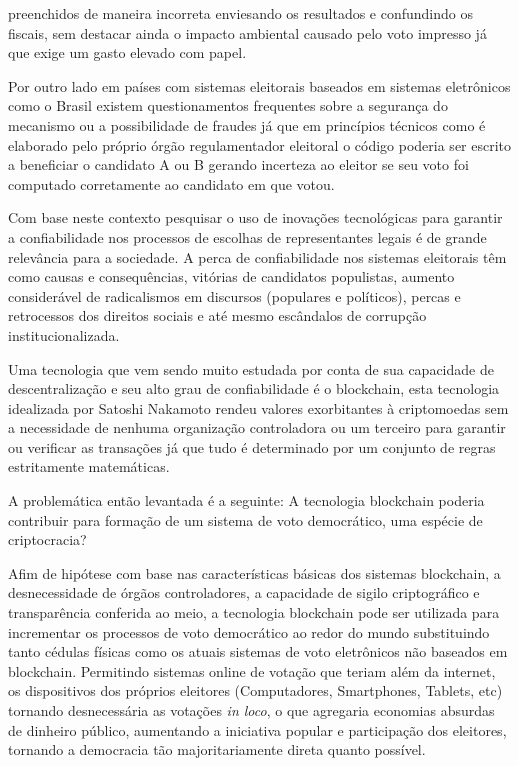 preenchidos de maneira incorreta enviesando os resultados e confundindo os fiscais, 
sem destacar ainda o impacto ambiental causado pelo voto impresso já que exige
um gasto elevado com papel.\par
Por outro lado em países com sistemas eleitorais baseados em sistemas eletrônicos
como o Brasil existem questionamentos frequentes sobre a segurança do mecanismo 
ou a possibilidade de fraudes já que em princípios técnicos como é elaborado
pelo próprio órgão regulamentador eleitoral o código poderia ser escrito a 
beneficiar o candidato A ou B gerando incerteza ao eleitor se seu voto
foi computado corretamente ao candidato em que votou. \par
Com base neste contexto pesquisar o uso de inovações tecnológicas para garantir a 
confiabilidade nos processos de escolhas de representantes legais é de grande relevância
para a sociedade. A perca de confiabilidade nos sistemas eleitorais têm como
causas e consequências, vitórias de candidatos populistas, aumento considerável
de radicalismos em discursos (populares e políticos), percas e retrocessos dos
direitos sociais e até mesmo escândalos de corrupção institucionalizada. \par
Uma tecnologia que vem sendo muito estudada por conta de sua capacidade de 
descentralização e seu alto grau de confiabilidade é o blockchain, esta tecnologia
idealizada por Satoshi Nakamoto \cite[Bitcoin P2P e-cash paper]{nakamoto2008re}
rendeu valores exorbitantes à criptomoedas sem a necessidade de nenhuma organização
controladora ou um terceiro para garantir ou verificar as transações já que tudo
é determinado por um conjunto de regras estritamente matemáticas. \par
A problemática então levantada é a seguinte: A tecnologia blockchain poderia contribuir
para formação de um sistema de voto democrático, uma espécie de criptocracia? \par
Afim de hipótese com base nas características básicas dos sistemas blockchain, 
a desnecessidade de órgãos controladores, a capacidade de sigilo criptográfico
e transparência conferida ao meio, a tecnologia blockchain pode ser
utilizada para incrementar os processos de voto democrático ao redor do mundo 
substituindo tanto cédulas físicas como os atuais sistemas de voto eletrônicos 
não baseados em blockchain. Permitindo sistemas online de votação que teriam 
além da internet, os dispositivos dos próprios eleitores (Computadores, Smartphones, 
Tablets, etc) tornando desnecessária as votações  \textit{in loco}, o que agregaria 
economias absurdas de dinheiro público, aumentando a iniciativa popular e participação dos eleitores, tornando a democracia tão 
majoritariamente direta quanto possível. \par
\clearpage
